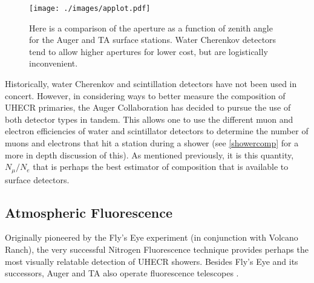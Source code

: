 \begin{figure}[h!]
\begin{center}
\texttt{[image: ./images/applot.pdf]}
\caption[Auger and TA Surface Detector Apertures]{Here is a comparison of the aperture as a function of zenith angle for the Auger and TA surface stations. Water Cherenkov detectors tend to allow higher apertures for lower cost, but are logistically inconvenient.}
\label{scintapp}
\end{center}
\end{figure}

Historically, water Cherenkov and scintillation detectors have not been used in concert. However, in considering ways to better measure the composition of UHECR primaries, the Auger Collaboration has decided to pursue the use of both detector types in tandem. This allows one to use the different muon and electron efficiencies of water and scintillator detectors to determine the number of muons and electrons that hit a station during a shower (see \autoref{showercomp} for a more in depth discussion of this). As mentioned previously, it is this quantity, $N_\mu/N_e$ that is perhaps the best estimator of composition that is available to surface detectors.


\subsection{Atmospheric Fluorescence}
\label{fluor}
Originally pioneered by the Fly's Eye experiment (in conjunction with Volcano Ranch), the very successful Nitrogen Fluorescence technique provides perhaps the most visually relatable detection of UHECR showers. Besides Fly's Eye and its successors, Auger and TA also operate fluorescence telescopes \cite{ultraray,flyseye}. 

